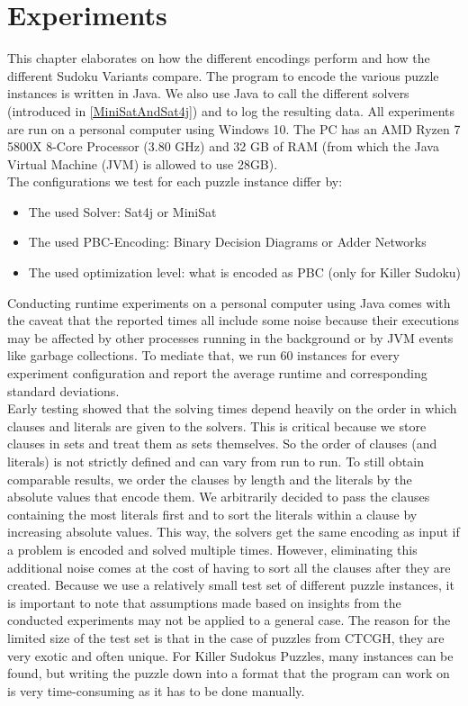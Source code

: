 \chapter{Experiments}
This chapter elaborates on how the different encodings perform and how the different Sudoku Variants compare.
The program to encode the various  puzzle instances is written in Java. We also use Java to call the different solvers (introduced in \ref{MiniSatAndSat4j}) and to log the resulting data. All experiments are run on a personal computer using Windows 10. The PC has an AMD Ryzen 7 5800X 8-Core Processor (3.80 GHz) and 32 GB of RAM (from which the Java Virtual Machine (JVM) is allowed to use 28GB).\\

The configurations we test for each puzzle instance differ by: 
\begin{itemize}
    \item The used Solver: Sat4j or MiniSat
    \item The used PBC-Encoding: Binary Decision Diagrams or Adder Networks
    \item The used optimization level: what is encoded as PBC (only for Killer Sudoku)
\end{itemize}

Conducting runtime experiments on a personal computer using Java comes with the caveat that the reported times all include some noise because their executions may be affected by other processes running in the background or by JVM events like garbage collections. To mediate that, we run 60 instances for every experiment configuration and report the average runtime and corresponding standard deviations.\\


Early testing showed that the solving times depend heavily on the order in which clauses and literals are given to the solvers. This is critical because we store clauses in sets and treat them as sets themselves. So the order of clauses (and literals) is not strictly defined and can vary from run to run. To still obtain comparable results, we order the clauses by length and the literals by the absolute values that encode them. We arbitrarily decided to pass the clauses containing the most literals first and to sort the literals within a clause by increasing absolute values. This way, the solvers get the same encoding as input if a problem is encoded and solved multiple times. However, eliminating this additional noise comes at the cost of having to sort all the clauses after they are created.
\newpage
Because we use a relatively small test set of different puzzle instances, it is important to note that assumptions made based on insights from the conducted experiments may not be applied to a general case. The reason for the limited size of the test set is that in the case of puzzles from CTCGH, they are very exotic and often unique. For Killer Sudokus Puzzles, many instances can be found, but writing the puzzle down into a format that the program can work on is very time-consuming as it has to be done manually.

